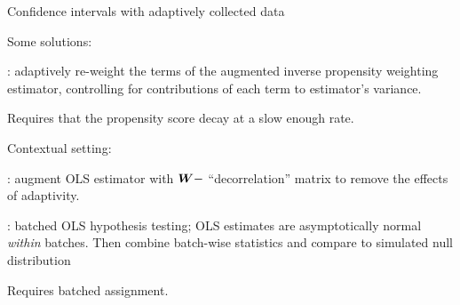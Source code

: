 \documentclass[xcolor={table}]{beamer}
\begin{document}
\begin{frame}{Confidence intervals with adaptively collected data}

Some solutions:
\begin{wideitemize}
\item \cite{hadad2021confidence}: adaptively re-weight the terms of the augmented inverse propensity weighting estimator, controlling for contributions of each term to estimator's variance.
\begin{wideitemize}
\item Requires that the propensity score decay at a slow enough rate.
\item Contextual setting: \cite{zhan2021off}\pause
\end{wideitemize}
\item \cite{deshpande2017accurate}: augment OLS estimator with $\bm{W}-$ ``decorrelation'' matrix to remove the effects of adaptivity. \pause
\item \cite{zhang2020inference}: batched OLS hypothesis testing; OLS estimates are asymptotically normal \textit{within} batches. Then combine batch-wise statistics and compare to simulated null distribution 
\begin{wideitemize}
\item Requires batched assignment. 
\end{wideitemize}
\end{wideitemize}


\end{frame}
\end{document}
